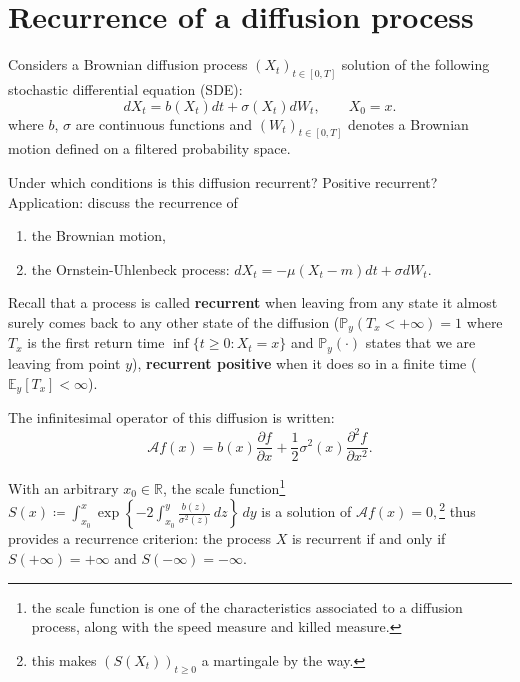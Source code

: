 \section{Recurrence of a diffusion process}

\begin{tcolorbox}[width=\linewidth, sharp corners=all, colback=white!95!black]
    Considers a Brownian diffusion process $(X_t)_{t\in [0,T]}$ solution of the following stochastic differential equation (SDE):
    \begin{equation*}\label{SDE}
    dX_t=b(X_t)dt+\sigma(X_t)dW_t,\qquad X_0=x.
    \end{equation*}
    where $b$, $\sigma$ are continuous functions and $(W_t)_{t\in [0,T]}$ denotes a Brownian motion defined on a filtered probability space.\newline

    Under which conditions is this diffusion recurrent? Positive recurrent?\\

    Application: discuss the recurrence of
    \begin{enumerate}
        \item the Brownian motion,
        \item the Ornstein-Uhlenbeck process: $dX_t=-\mu(X_t - m) dt + \sigma dW_t.$
    \end{enumerate}

\end{tcolorbox}

Recall that a process is called \textbf{recurrent} when leaving from any state it almost surely comes back to any other state of the diffusion ($\mathbb{P}_y(T_x < +\infty) = 1$ where $T_x$ is the first return time $\inf \{t\geq 0 : X_t = x\}$ and $\mathbb{P}_y(\cdot)$ states that we are leaving from point $y$), \textbf{recurrent positive} when it does so in a finite time ($\mathbb{E}_{y}\left[T_x\right] < \infty$).\newline

The infinitesimal operator of this diffusion is written:
\[
\mathcal{A}f(x) = b(x) \dfrac{\partial f}{\partial x} + \dfrac{1}{2}\sigma^2(x) \dfrac{\partial^2 f}{\partial x^2}. 
\]

With an arbitrary $x_0 \in \mathbb{R}$, the scale function\footnote{the scale function is one of the characteristics associated to a diffusion process, along with the speed measure and killed measure.} $S(x) \coloneqq \displaystyle \int_{x_0}^{x} \exp\left\{-2\displaystyle \int_{x_0}^{y} \frac{b(z)}{\sigma^2(z)} \,dz\right\} \,dy$ is a solution of $\mathcal{A}f(x)=0,$\footnote{this makes $(S(X_t))_{t\geq0}$ a martingale by the way.} thus provides a recurrence criterion: the process $X$ is recurrent if and only if $S(+\infty) = +\infty$ and $S(-\infty) = -\infty$.

